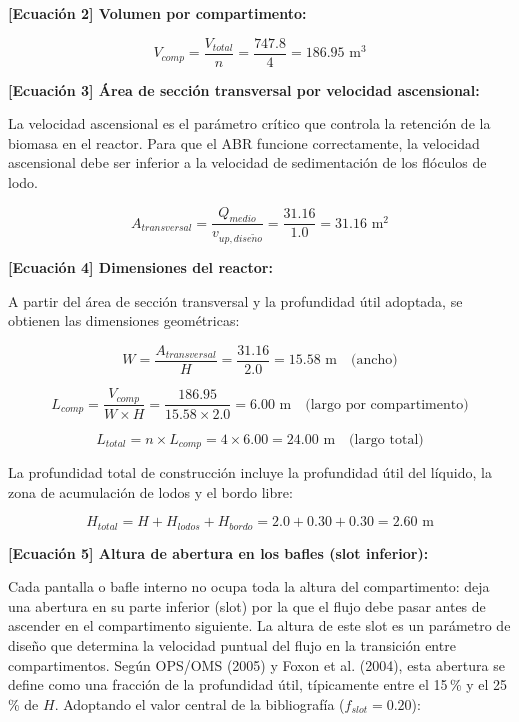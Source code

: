 \documentclass[12pt,a4paper]{article}
\begin{document}
\textbf{[Ecuación 2] Volumen por compartimento:}

\begin{equation}
V_{comp} = \frac{V_{total}}{n} = \frac{747.8}{4} = 186.95 \text{ m}^3
\end{equation}

\textbf{[Ecuación 3] Área de sección transversal por velocidad ascensional:}

La velocidad ascensional es el parámetro crítico que controla la retención de la biomasa en el reactor. Para que el ABR funcione correctamente, la velocidad ascensional debe ser inferior a la velocidad de sedimentación de los flóculos de lodo.

\begin{equation}
A_{transversal} = \frac{Q_{medio}}{v_{up, dise\tilde{n}o}} = \frac{31.16}{1.0} = 31.16 \text{ m}^2
\end{equation}

\textbf{[Ecuación 4] Dimensiones del reactor:}

A partir del área de sección transversal y la profundidad útil adoptada, se obtienen las dimensiones geométricas:

\begin{equation}
W = \frac{A_{transversal}}{H} = \frac{31.16}{2.0} = 15.58 \text{ m} \quad \text{(ancho)}
\end{equation}

\begin{equation}
L_{comp} = \frac{V_{comp}}{W \times H} = \frac{186.95}{15.58 \times 2.0} = 6.00 \text{ m} \quad \text{(largo por compartimento)}
\end{equation}

\begin{equation}
L_{total} = n \times L_{comp} = 4 \times 6.00 = 24.00 \text{ m} \quad \text{(largo total)}
\end{equation}

La profundidad total de construcción incluye la profundidad útil del líquido, la zona de acumulación de lodos y el bordo libre:

\begin{equation}
H_{total} = H + H_{lodos} + H_{bordo} = 2.0 + 0.30 + 0.30 = 2.60 \text{ m}
\end{equation}

\textbf{[Ecuación 5] Altura de abertura en los bafles (slot inferior):}

Cada pantalla o bafle interno no ocupa toda la altura del compartimento: deja una abertura en su parte inferior (slot) por la que el flujo debe pasar antes de ascender en el compartimento siguiente. La altura de este slot es un parámetro de diseño que determina la velocidad puntual del flujo en la transición entre compartimentos. Según OPS/OMS (2005) y Foxon et al. (2004), esta abertura se define como una fracción de la profundidad útil, típicamente entre el 15\,\% y el 25\,\% de $H$. Adoptando el valor central de la bibliografía ($f_{slot} = 0.20$):
\end{document}
